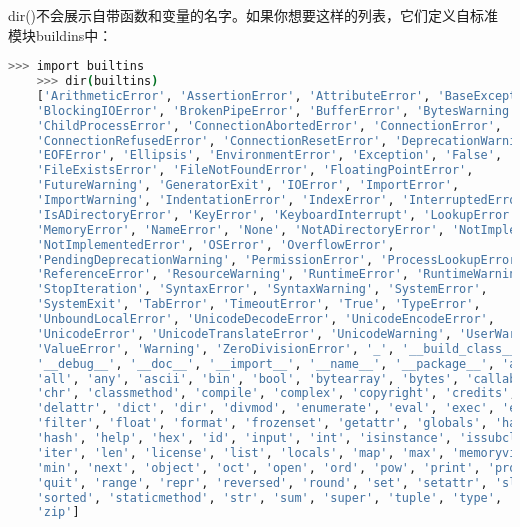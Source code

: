 \documentclass[../modules.tex]{subfiles}
\begin{document}
dir()不会展示自带函数和变量的名字。如果你想要这样的列表，它们定义自标准模块buildins中：
\begin{lstlisting}[language=bash]
    >>> import builtins
    >>> dir(builtins)  
    ['ArithmeticError', 'AssertionError', 'AttributeError', 'BaseException',
    'BlockingIOError', 'BrokenPipeError', 'BufferError', 'BytesWarning',
    'ChildProcessError', 'ConnectionAbortedError', 'ConnectionError',
    'ConnectionRefusedError', 'ConnectionResetError', 'DeprecationWarning',
    'EOFError', 'Ellipsis', 'EnvironmentError', 'Exception', 'False',
    'FileExistsError', 'FileNotFoundError', 'FloatingPointError',
    'FutureWarning', 'GeneratorExit', 'IOError', 'ImportError',
    'ImportWarning', 'IndentationError', 'IndexError', 'InterruptedError',
    'IsADirectoryError', 'KeyError', 'KeyboardInterrupt', 'LookupError',
    'MemoryError', 'NameError', 'None', 'NotADirectoryError', 'NotImplemented',
    'NotImplementedError', 'OSError', 'OverflowError',
    'PendingDeprecationWarning', 'PermissionError', 'ProcessLookupError',
    'ReferenceError', 'ResourceWarning', 'RuntimeError', 'RuntimeWarning',
    'StopIteration', 'SyntaxError', 'SyntaxWarning', 'SystemError',
    'SystemExit', 'TabError', 'TimeoutError', 'True', 'TypeError',
    'UnboundLocalError', 'UnicodeDecodeError', 'UnicodeEncodeError',
    'UnicodeError', 'UnicodeTranslateError', 'UnicodeWarning', 'UserWarning',
    'ValueError', 'Warning', 'ZeroDivisionError', '_', '__build_class__',
    '__debug__', '__doc__', '__import__', '__name__', '__package__', 'abs',
    'all', 'any', 'ascii', 'bin', 'bool', 'bytearray', 'bytes', 'callable',
    'chr', 'classmethod', 'compile', 'complex', 'copyright', 'credits',
    'delattr', 'dict', 'dir', 'divmod', 'enumerate', 'eval', 'exec', 'exit',
    'filter', 'float', 'format', 'frozenset', 'getattr', 'globals', 'hasattr',
    'hash', 'help', 'hex', 'id', 'input', 'int', 'isinstance', 'issubclass',
    'iter', 'len', 'license', 'list', 'locals', 'map', 'max', 'memoryview',
    'min', 'next', 'object', 'oct', 'open', 'ord', 'pow', 'print', 'property',
    'quit', 'range', 'repr', 'reversed', 'round', 'set', 'setattr', 'slice',
    'sorted', 'staticmethod', 'str', 'sum', 'super', 'tuple', 'type', 'vars',
    'zip']
\end{lstlisting}
\end{document}
